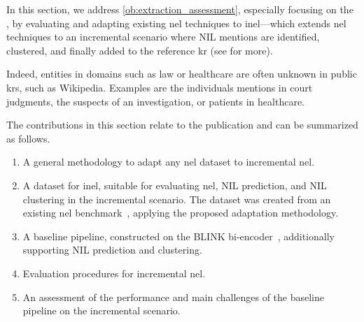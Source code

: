 


In this section, we address \ref{ob:extraction_assessment}, especially focusing on the \nilchallenge, by evaluating and adapting existing \acl{nel} techniques to \acf{inel}---which extends \ac{nel} techniques to an incremental scenario where NIL mentions are identified, clustered, and finally added to the reference \acf{kr} (see  for more).

Indeed, entities in domains such as law or healthcare are often unknown in public \acp{kr}, such as Wikipedia. Examples are the individuals mentions in court judgments, the suspects of an investigation, or patients in healthcare.

The contributions in this section relate to the \phd publication \textcite{ijckg2022} and can be summarized as follows.
\begin{enumerate}
    \item A general methodology to adapt any \ac{nel} dataset to incremental \ac{nel}.
    \item A dataset for \ac{inel}, suitable for evaluating \ac{nel}, NIL prediction, and NIL clustering in the incremental scenario. The dataset was created from an existing \ac{nel} benchmark~\cite{Onoe_Durrett_2020}, applying the proposed adaptation methodology.
    \item A baseline pipeline, constructed on the BLINK bi-encoder~\cite{blink}, additionally supporting NIL prediction and clustering.
    \item Evaluation procedures for incremental \ac{nel}.
    \item An assessment of the performance and main challenges of the baseline pipeline on the incremental scenario.
\end{enumerate}

